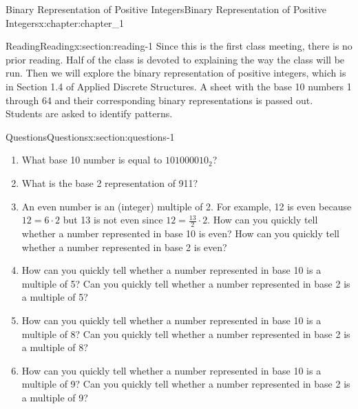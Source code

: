 \documentclass[oneside,10pt,]{book}
\numberwithin{equation}{section}
\begin{document}
\begin{chapterptx}{Binary Representation of Positive Integers}{}{Binary Representation of Positive Integers}{}{}{x:chapter:chapter_1}
%
%
%
\typeout{************************************************}
\typeout{************************************************}
%
\begin{sectionptx}{Reading}{}{Reading}{}{}{x:section:reading-1}
Since this is the first class meeting, there is no prior reading.  Half of the class is devoted to explaining the way the class will be run.  Then we will explore the binary representation of positive integers, which is in Section 1.4 of Applied Discrete Structures.  A sheet with the base 10 numbers 1 through 64 and their corresponding binary representations is passed out.  Students are asked to identify patterns.%
\end{sectionptx}
%
%
\typeout{************************************************}
\typeout{************************************************}
%
\begin{sectionptx}{Questions}{}{Questions}{}{}{x:section:questions-1}
%
\begin{enumerate}[label=\arabic*.]
\item{}What base 10 number is equal to \(101000010_2\)?%
\item{}What is the base 2 representation of 911?%
\item{}An even number is an (integer) multiple of 2.  For example, 12 is even because \(12 = 6 \cdot 2\) but 13 is not even since \(12 = \frac{13}{2} \cdot 2\).  How can you quickly tell whether a number represented in base 10  is even?  How can you quickly tell whether a number represented in base 2  is even?%
\item{}How can you quickly tell whether a number represented in base 10  is a multiple of 5?  Can you quickly tell whether a number represented in base 2  is a multiple of 5?%
\item{}How can you quickly tell whether a number represented in base 10  is a multiple of 8?  Can you quickly tell whether a number represented in base 2  is a multiple of 8?%
\item{}How can you quickly tell whether a number represented in base 10  is a multiple of 9?  Can you quickly tell whether a number represented in base 2  is a multiple of 9?%
\end{enumerate}
%
\end{sectionptx}

\end{chapterptx}
\end{document}
